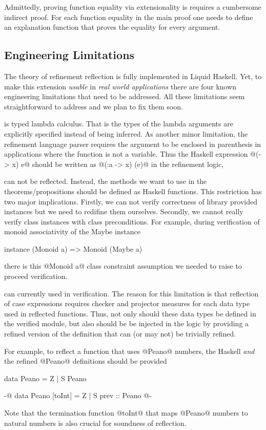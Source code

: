 Admittedly, proving function equality via extensionality
is requires a cumbersome indirect proof.
%
For each function equality in the main proof
one needs to define an explanation function
that proves the equality for every argument.


\subsection{Engineering Limitations}
The theory of refinement reflection is fully implemented in Liquid Haskell.
%
Yet, to make this extension \textit{usable} in \textit{real world applications}
there are four known engineering limitations that need to be addressed.
%
All these limitations seem straightforward to address
and we plan to fix them soon.

is typed lambda calculus. That is the types of the lambda arguments are
explicitly specified
instead of being inferred.
%
As another minor limitation, the refinement language parser
requires the argument to be enclosed in parenthesis
in applications where the function is not a variable.
%
Thus the Haskell expression
@(\x -> x) e@ should be written as @(\x:a -> x) (e)@
in the refinement logic,

 can not be reflected.
%
Instead, the methods we want to use in the theorems/propositions
should be defined as Haskell functions.
%
This restriction has two major implications.
%
Firstly, we can not verify correctness of library provided
instances but we need to redifine them ourselves.
%
Secondly, we cannot really verify class instances with class preconditions.
%
For example, during verification of monoid associativity of the Maybe instance
\begin{code}
  instance (Monoid a) => Monoid (Maybe a)
\end{code}
%
there is this @Monoid a@ class constraint assumption we needed to raise to
proceed verification.

can currently used in verification.
%
The reason for this limitation is that
reflection of case expressions
requires checker and projector measures for each
data type used in reflected functions.
%
Thus, not only should these data types be defined in
the verified module, but also should be
be injected in the logic by providing a refined version of
the definition that can (or may not) be trivially refined.

For example, to reflect a function that uses
@Peano@ numbers, the Haskell \textit{and} the refined @Peano@
definitions should be provided
%
\begin{code}
data Peano = Z | S Peano

{-@ data Peano [toInt]
     = Z
     | S {prev :: Peano}
  @-}
\end{code}
%
Note that the termination function @toInt@
that maps @Peano@ numbers to natural numbers
is also crucial for soundness of reflection.

